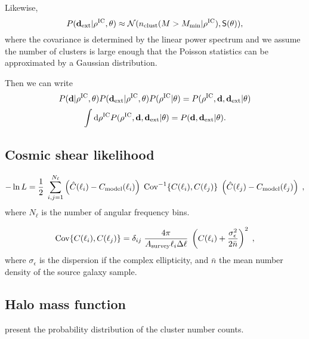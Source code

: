 \documentclass[preprint]{aastex}
\newcommand{\data}{\mathbf{d}}
\newcommand{\dataext}{\data_{\rm ext}}
\newcommand{\normdist}{\mathcal{N}}
\newcommand{\smat}{\mathsf{S}}
\begin{document}
Likewise,
\begin{equation}
	P(\dataext|\rho^\text{IC},\theta) \approx \normdist(n_\text{clust}(M>M_\text{min} |
	\rho^\text{IC}), \smat(\theta)),
\end{equation}
where the covariance is determined by the linear power spectrum and we assume the number of clusters 
is large enough that the Poisson statistics can be approximated by a Gaussian distribution.

Then we can write
\begin{equation}
	P(\data|\rho^\text{IC},\theta)P(\dataext|\rho^\text{IC},\theta)P(\rho^\text{IC}|\theta)
	= 
	P(\rho^\text{IC}, \data,\dataext| \theta)
\end{equation}
\begin{equation}
	\int \mathrm{d}\rho^\text{IC} P(\rho^\text{IC}, \data,\dataext |\theta) 
	= P(\data, \dataext | \theta).
\end{equation}


\subsection{Cosmic shear likelihood}

\begin{equation}
- \ln L = \frac{1}{2}\; \sum_{i,j=1}^{N_\ell} \left(  \hat{C}(\ell_i) - C_{\rm model}(\ell_i) \right)\; {\rm Cov}^{-1}\{  C(\ell_i), C(\ell_j) \}\; \left(  \hat{C}(\ell_j) - C_{\rm model}(\ell_j) \right)\;,
\end{equation}
where $N_\ell$ is the number of angular frequency bins.

\begin{equation}
{\rm Cov}\{  C(\ell_i), C(\ell_j) \}= \delta_{ij}\; \frac{4 \pi}{A_{\rm survey} \ell_i \Delta \ell}\; \left( C(\ell_i) + \frac{\sigma_\epsilon^2}{2 \bar{n}} \right)^2\;,
\end{equation}
where $\sigma_\epsilon$ is the dispersion if the complex ellipticity, and $\bar{n}$ the mean number density of the source galaxy sample.


\subsection{Halo mass function}
\citet{lima2004} present the probability distribution of the cluster number counts.

\end{document}
